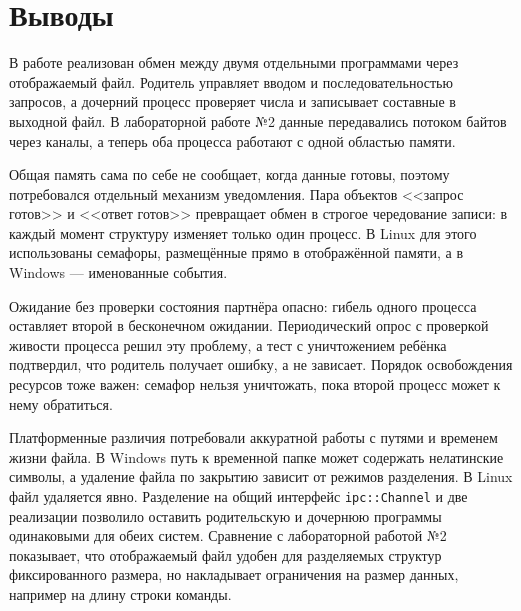 \section{Выводы}
В работе реализован обмен между двумя отдельными программами через отображаемый файл. Родитель управляет вводом и последовательностью запросов, а дочерний процесс проверяет числа и записывает составные в выходной файл. В лабораторной работе №2 данные передавались потоком байтов через каналы, а теперь оба процесса работают с одной областью памяти.

Общая память сама по себе не сообщает, когда данные готовы, поэтому потребовался отдельный механизм уведомления. Пара объектов <<запрос готов>> и <<ответ готов>> превращает обмен в строгое чередование записи: в каждый момент структуру изменяет только один процесс. В Linux для этого использованы семафоры, размещённые прямо в отображённой памяти, а в Windows --- именованные события.

Ожидание без проверки состояния партнёра опасно: гибель одного процесса оставляет второй в бесконечном ожидании. Периодический опрос с проверкой живости процесса решил эту проблему, а тест с уничтожением ребёнка подтвердил, что родитель получает ошибку, а не зависает. Порядок освобождения ресурсов тоже важен: семафор нельзя уничтожать, пока второй процесс может к нему обратиться.

Платформенные различия потребовали аккуратной работы с путями и временем жизни файла. В Windows путь к временной папке может содержать нелатинские символы, а удаление файла по закрытию зависит от режимов разделения. В Linux файл удаляется явно. Разделение на общий интерфейс \texttt{ipc::Channel} и две реализации позволило оставить родительскую и дочернюю программы одинаковыми для обеих систем. Сравнение с лабораторной работой №2 показывает, что отображаемый файл удобен для разделяемых структур фиксированного размера, но накладывает ограничения на размер данных, например на длину строки команды.
